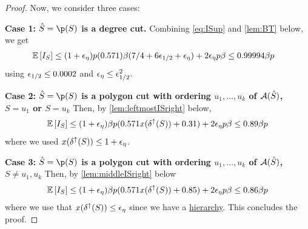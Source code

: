 \begin{proof}
Now, we consider three cases: 

\textbf{Case 1:  $\hat{S}=\p(S)$ is a degree cut.}
Combining \eqref{eq:ISup} and \cref{lem:BT} below, we get
\begin{align*}\E{I_S} %
	&\leq (1+\eps_\eta) p(0.571)\beta (7/4+6\eps_{1/2}+\eps_\eta) + 2\eps_\eta p \beta \leq 0.99994\beta p
\end{align*}
using ${\epsilon}_{1/2}\leq 0.0002$ and ${\epsilon}_\eta\leq {\epsilon}_{1/2}^2$.

\textbf{Case 2: $\hat{S}=\p(S)$ is a polygon cut with ordering $u_1,\dots,u_k$ of ${\cal A}(\hat{S})$, $S=u_1$ or $S=u_k$}
Then, by \cref{lem:leftmostISright} below, 
\begin{align*}
{\mathbb{E}}\left[I_S\right]\leq (1+{\epsilon}_\eta)\beta p (0.571x(\delta^\uparrow(S)) + 0.31) + 2{\epsilon}_\eta p \beta \leq 0.89 \beta p 
\end{align*}
where we used $x(\delta^\uparrow(S))\leq 1+{\epsilon}_\eta$.

\textbf{Case 3: $\hat{S}=\p(S)$ is a polygon cut with ordering $u_1,\dots,u_k$ of ${\cal A}(\hat{S})$, $S\neq u_1, u_k$}
Then, by \cref{lem:middleISright} below
\begin{align*}
{\mathbb{E}}\left[I_S\right]\leq (1+{\epsilon}_\eta)\beta p (0.571x(\delta^\uparrow(S)) + 0.85) + 2{\epsilon}_\eta p \beta \leq 0.86 \beta p
\end{align*}
where we use that $x(\delta^\uparrow(S))\leq {\epsilon}_\eta$ since we have a \hyperlink{tar:hierarchy}{hierarchy}.
This concludes the proof.	
\end{proof}

